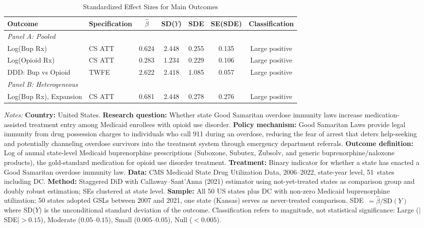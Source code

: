\begin{table}[H]
\centering
\caption{Standardized Effect Sizes for Main Outcomes}
\label{tab:sde}
\begin{threeparttable}
\begin{adjustbox}{max width=\textwidth}
\begin{tabular}{llccccc}
\toprule
Outcome & Specification & $\hat{\beta}$ & SD($Y$) & SDE & SE(SDE) & Classification \\
\midrule
\multicolumn{7}{l}{\textit{Panel A: Pooled}} \\
Log(Bup Rx) & CS ATT & 0.624 & 2.448 & 0.255 & 0.135 & Large positive \\
Log(Opioid Rx) & CS ATT & 0.283 & 1.234 & 0.229 & 0.106 & Large positive \\
DDD: Bup vs Opioid & TWFE & 2.622 & 2.418 & 1.085 & 0.057 & Large positive \\
\midrule
\multicolumn{7}{l}{\textit{Panel B: Heterogeneous}} \\
Log(Bup Rx), Expansion & CS ATT & 0.681 & 2.448 & 0.278 & 0.276 & Large positive \\
\bottomrule
\end{tabular}
\end{adjustbox}
\end{threeparttable}
\par\vspace{0.3em}
\begin{minipage}{\textwidth}
\scriptsize\sloppy
\textit{Notes:}
\textbf{Country:} United States.
\textbf{Research question:} Whether state Good Samaritan overdose immunity laws increase medication-assisted treatment entry among Medicaid enrollees with opioid use disorder.
\textbf{Policy mechanism:} Good Samaritan Laws provide legal immunity from drug possession charges to individuals who call 911 during an overdose, reducing the fear of arrest that deters help-seeking and potentially channeling overdose survivors into the treatment system through emergency department referrals.
\textbf{Outcome definition:} Log of annual state-level Medicaid buprenorphine prescriptions (Suboxone, Subutex, Zubsolv, and generic buprenorphine/naloxone products), the gold-standard medication for opioid use disorder treatment.
\textbf{Treatment:} Binary indicator for whether a state has enacted a Good Samaritan overdose immunity law.
\textbf{Data:} CMS Medicaid State Drug Utilization Data, 2006--2022, state-year level, 51~states including DC.
\textbf{Method:} Staggered DiD with Callaway--Sant'Anna (2021) estimator using not-yet-treated states as comparison group and doubly robust estimation; SEs clustered at state level.
\textbf{Sample:} All 50 US states plus DC with non-zero Medicaid buprenorphine utilization; 50 states adopted GSLs between 2007 and 2021, one state (Kansas) serves as never-treated comparison.
SDE~$= \hat{\beta} / \text{SD}(Y)$ where SD($Y$) is the unconditional standard deviation of the outcome.
Classification refers to magnitude, not statistical significance:
Large ($|$SDE$| > 0.15$), Moderate ($0.05$--$0.15$), Small ($0.005$--$0.05$), Null ($< 0.005$).
\end{minipage}
\end{table}

